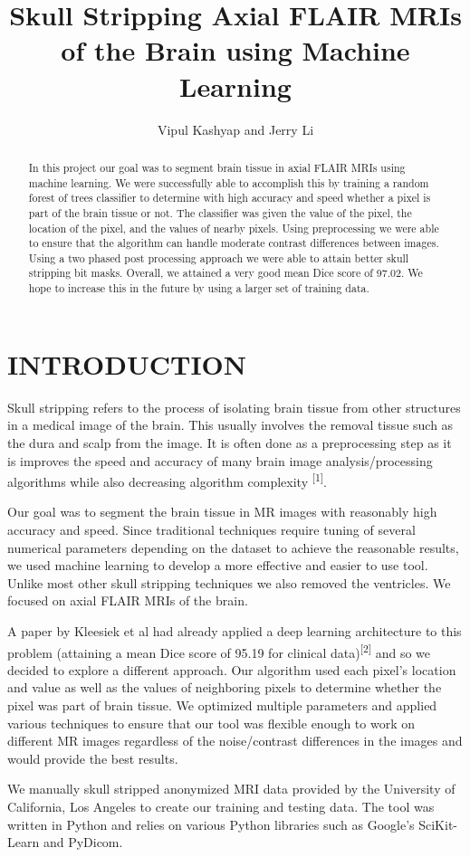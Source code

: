 \documentclass[letterpaper, 10 pt, conference]{ieeeconf}
\title{\LARGE \bf
Skull Stripping Axial FLAIR MRIs\\ of the Brain using Machine Learning
}
\author{Vipul Kashyap and Jerry Li
}
\begin{document}
\maketitle
\thispagestyle{empty}
\pagestyle{empty}

\begin{abstract}
In this project our goal was to segment brain tissue in axial FLAIR MRIs using machine learning. We were successfully able to accomplish this by training a random forest of trees classifier to determine with high accuracy and speed whether a pixel is part of the brain tissue or not. The classifier was given the value of the pixel, the location of the pixel, and the values of nearby pixels. Using preprocessing we were able to ensure that the algorithm can handle moderate contrast differences between images. Using a two phased post processing approach we were able to attain better skull stripping bit masks. Overall, we attained a very good mean Dice score of 97.02. We hope to increase this in the future by using a larger set of training data.
\end{abstract}

\section{INTRODUCTION}
Skull stripping refers to the process of isolating brain tissue from other structures in a medical image of the brain. This usually involves the removal tissue such as the dura and scalp from the image. It is often done as a preprocessing step as it is improves the speed and accuracy of many brain image analysis/processing algorithms while also decreasing algorithm complexity \textsuperscript{[1]}. \par
Our goal was to segment the brain tissue in MR images with reasonably high accuracy and speed. Since traditional techniques require tuning of several numerical parameters depending on the dataset to achieve the reasonable results, we used machine learning to develop a more effective and easier to use tool. Unlike most other skull stripping techniques we also removed the ventricles. We focused on axial FLAIR MRIs of the brain. \par
A paper by Kleesiek et al had already applied a deep learning architecture to this problem (attaining a mean Dice score of 95.19 for clinical data)\textsuperscript{[2]} and so we decided to explore a different approach. Our algorithm used each pixel's location and value as well as the values of neighboring pixels to determine whether the pixel was part of brain tissue. We optimized multiple parameters and applied various techniques to ensure that our tool was flexible enough to work on different MR images regardless of the noise/contrast differences in the images and would provide the best results. \par
We manually skull stripped anonymized MRI data provided by the University of California, Los Angeles to create our training and testing data. The tool was written in Python and relies on various Python libraries such as Google's SciKit-Learn and PyDicom.
\end{document}
